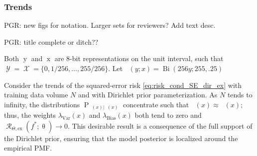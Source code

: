 \documentclass{article}
\DeclareMathOperator{\xrm}{\mathrm{x}}
\DeclareMathOperator{\yrm}{\mathrm{y}}
\DeclareMathOperator{\Prm}{\mathrm{P}}
\DeclareMathOperator{\Xcal}{\mathcal{X}}
\DeclareMathOperator{\Ycal}{\mathcal{Y}}
\DeclareMathOperator{\Rcal}{\mathcal{R}}
\DeclareMathOperator{\Bi}{\mathrm{Bi}}
\DeclareMathOperator{\thetam}{\theta_\text{m}}
\DeclareMathOperator{\upthetam}{\uptheta_\text{m}}
\DeclareMathOperator{\thetac}{\theta_\text{c}}
\DeclareMathOperator{\uppsim}{\uppsi_\text{m}}
\begin{document}
\subsubsection{Trends}

PGR: new figs for notation. Larger sets for reviewers? Add text desc.

PGR: title complete or ditch??

Both $\yrm$ and $\xrm$ are 8-bit representations on the unit interval, such that $\Ycal = \Xcal = \{0,1/256,\ldots,255/256\}$. Let $\thetac(y;x) = \Bi(256y;255,.25)$


Consider the trends of the squared-error risk \eqref{eq:risk_cond_SE_dir_ex} with training data volume $N$ and with Dirichlet prior parameterization. As $N$ tends to infinity, the distributions $\Prm_{\uppsim(x) | \upthetam(x)}$ concentrate such that $\uppsim(x) \approx \thetam(x)$; thus, the weights $\lambda_{\text{Var}}(x)$ and $\lambda_{\text{Bias}}(x)$ both tend to zero and $\Rcal_{\Theta, \mathrm{ex}}(f^* ; \uptheta) \to 0$. This desirable result is a consequence of the full support of the Dirichlet prior, ensuring that the model posterior is localized around the empirical PMF.
\end{document}
